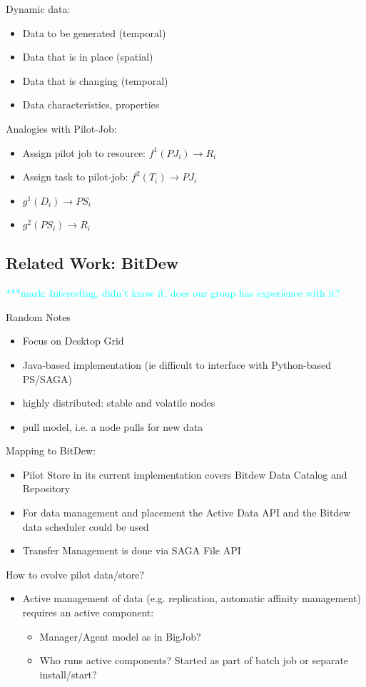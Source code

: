 \documentclass[]{article}
\newcommand{\msnote}[1]{ {\textcolor{cyan} { ***mark: #1 }}}
\begin{document}
	
\noindent	
Dynamic data:
\begin{itemize}
	\item Data to be generated (temporal)
	\item Data that is in place (spatial)
	\item Data that is changing (temporal)
	\item Data characteristics, properties
\end{itemize}	

\noindent
Analogies with Pilot-Job:
\begin{itemize}
	\item Assign pilot job to resource: $f^{1}(PJ_i) \rightarrow R_i$
	\item Assign task to pilot-job: $f^{2}(T_i) \rightarrow PJ_i$ 

	\item $g^{1} (D_i) \rightarrow PS_i$
	\item $g^{2} (PS_i) \rightarrow R_i$
\end{itemize}

\subsection{Related Work: BitDew}
\msnote{Interesting, didn't know it, does our group has experience with it?}

Random Notes
\begin{itemize}
	\item Focus on Desktop Grid
	\item Java-based implementation (ie difficult to interface with Python-based PS/SAGA)
	\item highly distributed: stable and volatile nodes
	\item pull model, i.e. a node pulls for new data
\end{itemize}


Mapping to BitDew:
\begin{itemize}
	\item Pilot Store in its current implementation covers Bitdew Data Catalog and Repository
	\item For data management and placement the Active Data API and the Bitdew data scheduler could be used
	\item Transfer Management is done via SAGA File API	
\end{itemize}

How to evolve pilot data/store?
\begin{itemize}
	\item Active management of data (e.g. replication, automatic affinity management) requires an active component:
	\begin{itemize}
		\item Manager/Agent model as in BigJob?
		\item Who runs active components? Started as part of batch job or separate install/start?
	\end{itemize}
\end{itemize}
\end{document}
